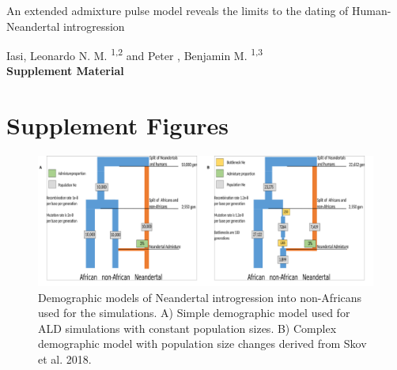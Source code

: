 \documentclass[11pt]{article}
\begin{document}
\begin{titlepage}


    \vspace*{1cm}
        
        
    \begin{center}       
        \large
        \vspace{1cm}
        An extended admixture pulse model reveals the limits to the dating of Human-Neandertal introgression
        
       \vspace{1.0cm}
        \large
        Iasi, Leonardo N. M. \textsuperscript{1,2} and Peter , Benjamin M. \textsuperscript{1,3} \\ 
        
        \vspace{1.0cm}
            \Huge
            \textbf{Supplement Material}
    \end{center} 

            

\end{titlepage}

\section{Supplement Figures}

\begin{figure}
\centering
\includegraphics{Admixture_Time_Inference_Paper_Draft_files/figure-latex/Simple_and_Skov.pdf}
\caption{\label{fig:figS1} Demographic models of Neandertal introgression into non-Africans used for the simulations. A) Simple demographic model used for ALD simulations with constant population sizes. B) Complex demographic model with population size changes derived from Skov et al. 2018.}
\end{figure}
\end{document}
